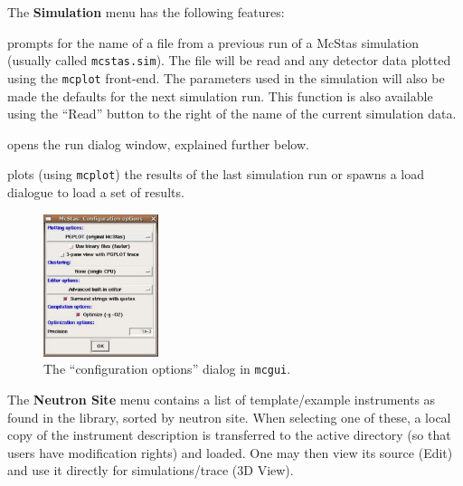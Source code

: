 \noindent The \textbf{Simulation} menu has the following features:
\begin{description}
\item[Simulation/Read old simulation] prompts for the name of a file
  from a previous run of a McStas simulation (usually called
  \verb+mcstas.sim+). The file will be read and any detector data
  plotted using the \verb+mcplot+ front-end. The parameters used in the
  simulation will also be made the defaults for the next simulation
  run. This function is also available using the ``Read'' button to the
  right of the name of the current simulation data.
\item[Simulation/Run simulation] opens the run dialog window, explained
  further below.
\item[Simulation/Plot results] plots (using \verb+mcplot+) the results of the
  last simulation run or spawns a load dialogue to load a set of results.
\end{description}


\begin{figure}[htb!]
  \begin{center}
    \includegraphics[width=0.3\textwidth]{figures/choose_backend}
  \end{center}
\caption{The ``configuration options'' dialog in \texttt{mcgui}.}
\label{fig:mcgui-choose}
\end{figure}


\noindent The \textbf{Neutron Site} menu contains a list of template/example
instruments as found in the \MCS library, sorted by neutron site. When
selecting one of these, a local copy of the instrument description is
transferred to the active directory (so that users have modification rights) and
loaded. One may then view its source (Edit) and use it directly for
simulations/trace (3D View).
\\\ \\

